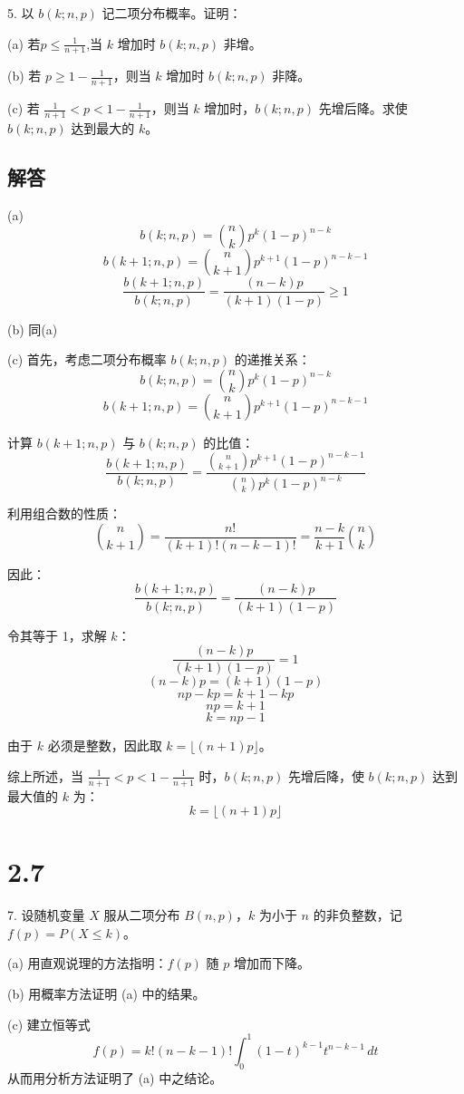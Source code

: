 \documentclass[UTF8]{report}
\theoremstyle{MyLineTheoremStyle} %
\theoremstyle{MyBlockTheoremStyle} %
\theoremstyle{MySubsubsectionStyle} %
\begin{document}
5. 以 \(b(k; n, p)\) 记二项分布概率。证明：\par
(a) 若\(p \leq \frac{1}{n+1}\),当 \(k\) 增加时 \(b(k; n, p)\) 非增。\par
(b) 若 \(p \geq 1 - \frac{1}{n+1}\)，则当 \(k\) 增加时 \(b(k; n, p)\) 非降。\par
(c) 若 \(\frac{1}{n+1} < p < 1 - \frac{1}{n+1}\)，则当 \(k\) 增加时，\(b(k; n, p)\) 先增后降。求使 \(b(k; n, p)\) 达到最大的 \(k\)。

\subsection*{解答}

(a)
\[
b(k; n, p) = \binom{n}{k} p^k (1-p)^{n-k}
\]
\[
b(k+1; n, p) = \binom{n}{k+1} p^{k+1} (1-p)^{n-k-1}
\]
\[
\frac{b(k+1; n, p)}{b(k; n, p)} = \frac{(n-k)p}{(k+1)(1-p)} \geq 1
\]

(b) 同(a)

(c) 首先，考虑二项分布概率 \(b(k; n, p)\) 的递推关系：
\[
b(k; n, p) = \binom{n}{k} p^k (1-p)^{n-k}
\]
\[
b(k+1; n, p) = \binom{n}{k+1} p^{k+1} (1-p)^{n-k-1}
\]

计算 \(b(k+1; n, p)\) 与 \(b(k; n, p)\) 的比值：
\[
\frac{b(k+1; n, p)}{b(k; n, p)} = \frac{\binom{n}{k+1} p^{k+1} (1-p)^{n-k-1}}{\binom{n}{k} p^k (1-p)^{n-k}}
\]

利用组合数的性质：
\[
\binom{n}{k+1} = \frac{n!}{(k+1)!(n-k-1)!} = \frac{n-k}{k+1} \binom{n}{k}
\]

因此：
\[
\frac{b(k+1; n, p)}{b(k; n, p)} = \frac{(n-k)p}{(k+1)(1-p)}
\]

令其等于 1，求解 \(k\)：
\[
\frac{(n-k)p}{(k+1)(1-p)} = 1
\]
\[
(n-k)p = (k+1)(1-p)
\]
\[
np - kp = k + 1 - kp
\]
\[
np = k + 1
\]
\[
k = np - 1
\]

由于 \(k\) 必须是整数，因此取 \(k = \lfloor (n+1)p \rfloor\)。

综上所述，当 \(\frac{1}{n+1} < p < 1 - \frac{1}{n+1}\) 时，\(b(k; n, p)\) 先增后降，使 \(b(k; n, p)\) 达到最大值的 \(k\) 为：
\[
k = \lfloor (n+1)p \rfloor
\]

\section{2.7}

7. 设随机变量 \(X\) 服从二项分布 \(B(n, p)\)，\(k\) 为小于 \(n\) 的非负整数，记 \(f(p) = P(X \leq k)\)。

(a) 用直观说理的方法指明：\(f(p)\) 随 \(p\) 增加而下降。\par
(b) 用概率方法证明 (a) 中的结果。\par
(c) 建立恒等式
\[
f(p) = k! (n-k-1)! \int_0^1 (1-t)^{k-1} t^{n-k-1} \, dt
\]
从而用分析方法证明了 (a) 中之结论。
\end{document}
